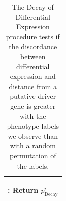 \documentclass[11pt]{article}
\begin{document}
\begin{table}[hb!]
\begin{tabular}{ p{\textwidth } }
\begin{description}
\begin{enumerate}
    \end{enumerate}


    \item[\textbf{Output}]: Return $p^i_{\text{Decay}}$


  \end{description} \\
  
  \hline
\end{tabular}

\caption{The Decay of Differential Expression procedure tests if the discordance
between differential expression and distance from a putative driver gene is
greater with the phenotype labels we observe than with a random permutation 
of the labels.}

\label{tab:procedure-decay}
\end{table}




\clearpage


\end{document}
